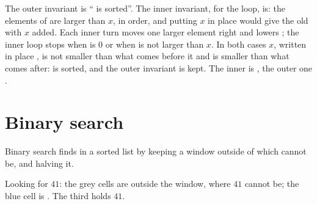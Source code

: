 The outer invariant is `` is sorted''. The inner invariant, for the  loop, is: the elements of
 are larger than $x$, in order, and putting $x$ in place  would give the old
 with $x$ added. Each inner turn moves one larger element right and lowers ; the inner loop stops
when  is $0$ or when  is not larger than $x$. In both cases $x$, written in place , is
not smaller than what comes before it and is smaller than what comes after:  is sorted, and the outer
invariant is kept. The inner  is , the outer one .

\section{Binary search}\label{sec:g11:proving-algorithms-correct:binary-search}

Binary search finds  in a sorted list by keeping a window  outside of which  cannot be,
and halving it.

\label{lst:g11:proving-algorithms-correct:binary-search}

\label{out:g11:proving-algorithms-correct:binary-search}

\begin{omfigure}

{\small Looking for $41$: the grey cells are outside the window, where $41$ cannot be; the blue cell is .
The third  holds $41$.}
\end{omfigure}

